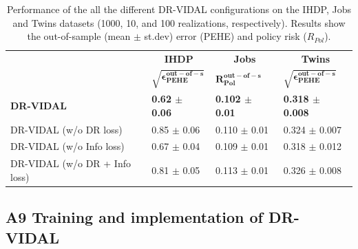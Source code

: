\documentclass{amia}
\begin{document}
\begin{table}[h]
\fontsize{7.2pt}{0.35cm}\selectfont
\centering
\begin{tabular}{l|l|l|l}

\toprule 
      & \multicolumn{1}{c}{\textbf{IHDP}} & \multicolumn{1}{|c}{\textbf{Jobs}} & \multicolumn{1}{|c}{\textbf{Twins}} \\
      & $\boldsymbol{\sqrt{\epsilon^{out-of-s}_{PEHE}}}$ 
      & $\boldsymbol{R^{out-of-s}_{Pol}}$ 
      & $\boldsymbol{\sqrt{\epsilon^{out-of-s}_{PEHE}}}$  \\
\midrule 
      \textbf{DR-VIDAL}      & \textbf{0.62 $\pm$ 0.06}  & \textbf{0.102 $\pm$ 0.01} & 
       \textbf{0.318 $\pm$ 0.008} \\
      DR-VIDAL (w/o DR loss) & 0.85 $\pm$ 0.06 & 0.110 $\pm$ 0.01  &
      0.324 $\pm$ 0.007 \\
      DR-VIDAL (w/o Info loss)    & 0.67 $\pm$ 0.04 & 0.109 $\pm$ 0.01 &
      0.318 $\pm$ 0.012\\
      DR-VIDAL (w/o DR + Info loss) & 0.81 $\pm$ 0.05 & 0.113 $\pm$ 0.01 &
      0.326 $\pm$ 0.008 \\
\bottomrule
\end{tabular}
\caption{Performance of the all the different DR-VIDAL configurations on the IHDP, Jobs and Twins datasets (1000, 10, and 100 realizations, respectively). Results show the out-of-sample (mean $\pm$ st.dev) error (PEHE) and policy risk ($R_{Pol}$).}\smallskip
\label{tab: big_table}
\end{table}

\subsection*{A9 Training and implementation of DR-VIDAL}
\label{A-Training}
\end{document}
